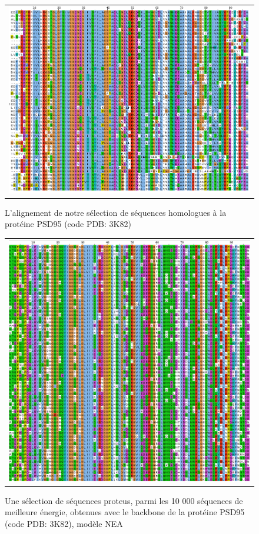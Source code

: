    \begin{figure}[t]
     \centering
     \begin{tabular}{c}
       \includegraphics[width=17cm]{homologues/3K82.png} \\
     \end{tabular}
     \caption{L'alignement de notre sélection de séquences homologues à la protéine PSD95 (code PDB: 3K82)}
\label{align_homo:PSD95}
   \end{figure}

   \begin{figure}[t]
     \centering
     \begin{tabular}{c}
       \includegraphics[width=17cm]{proteus/3K82.png} \\
     \end{tabular}
       \caption{Une sélection de séquences proteus, parmi les 10 000 séquences de meilleure énergie, obtenues avec le backbone de la protéine PSD95 (code PDB: 3K82), modèle NEA}
\label{align_proteus:PSD95}
   \end{figure}
\clearpage

